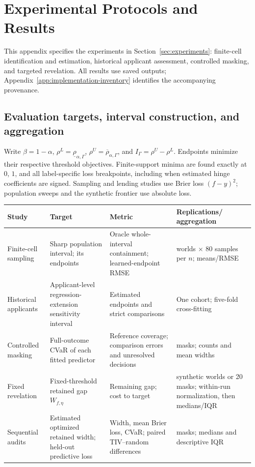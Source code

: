 \section{Experimental Protocols and Results}
\label{app:d}\label{app:experiments}

This appendix specifies the experiments in Section~\ref{sec:experiments}:
finite-cell identification and estimation, historical applicant assessment,
controlled masking, and targeted revelation. All results use saved outputs;
Appendix~\ref{app:implementation-inventory} identifies the accompanying provenance.

\subsection{Evaluation targets, interval construction, and aggregation}
\label{app:evaluation-targets}

Write $\beta=1-\alpha$, $\rho^L=\underline\rho_{\alpha,\Gamma}$,
$\rho^U=\overline\rho_{\alpha,\Gamma}$, and $I_\Gamma=\rho^U-\rho^L$.
Endpoints minimize their respective threshold objectives. Finite-support minima
are found exactly at $0$, $1$, and all label-specific loss breakpoints, including
when estimated hinge coefficients are signed. Sampling and lending studies use
Brier loss $(f-y)^2$; population sweeps and the synthetic frontier use absolute loss.

\begin{center}
\small\setlength{\tabcolsep}{3pt}
\begin{tabularx}{\textwidth}{@{}>{\raggedright\arraybackslash}p{}>{\raggedright\arraybackslash}X>{\raggedright\arraybackslash}X>{\raggedright\arraybackslash}p{}@{}}
\toprule
Study & Target & Metric & \shortstack[l]{Replications/\\aggregation}\\
\midrule
Finite-cell sampling & Sharp population interval; its endpoints & Oracle whole-interval containment; learned-endpoint RMSE & 60 worlds $\times$ 80 samples per $n$; means/RMSE\\
Historical applicants & Applicant-level regression-extension sensitivity interval & Estimated endpoints and strict comparisons & One cohort; five-fold cross-fitting\\
Controlled masking & Full-outcome CVaR of each fitted predictor & Reference coverage; comparison errors and unresolved decisions & 20 masks; counts and mean widths\\
Fixed revelation & Fixed-threshold retained gap $W_{f,\eta}$ & Remaining gap; cost to target & 120 synthetic worlds or 20 masks; within-run normalization, then medians/IQR\\
Sequential audits & Estimated optimized retained width; held-out predictive loss & Width, mean Brier loss, CVaR; paired TIV--random differences & 20 masks; medians and descriptive IQR\\
\bottomrule
\end{tabularx}
\end{center}

